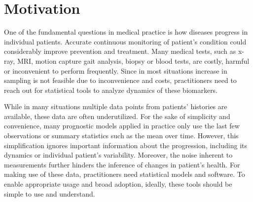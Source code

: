 \documentclass[preprint]{imsart}
\numberwithin{equation}{section}
\theoremstyle{plain}
\begin{document}
\begin{frontmatter}
\begin{abstract}
  
\end{abstract}

\begin{keyword}[class=MSC]
\end{keyword}

\begin{keyword}
\end{keyword}

\end{frontmatter}

\maketitle


\section{Motivation}

One of the fundamental questions in medical practice is how diseases progress in individual patients. Accurate continuous monitoring of patient's condition could considerably improve prevention and treatment. Many medical tests, such as x-ray, MRI, motion capture gait analysis, biopsy or blood tests, are costly, harmful or inconvenient to perform frequently. Since in most situations increase in sampling is not feasible due to inconvenience and costs, practitioners need to reach out for statistical tools to analyze dynamics of these biomarkers.

While in many situations multiple data points from patients' histories are available, these data are often underutilized. For the sake of simplicity and convenience, many prognostic models applied in practice only use the last few observations or summary statistics such as the mean over time. However, this simplification ignores important information about the progression, including its dynamics or individual patient's variability. Moreover, the noise inherent to measurements further hinders the inference of changes in patient's health. For making use of these data, practitioners need statistical models and software. To enable appropriate usage and broad adoption, ideally, these tools should be simple to use and understand.
\end{document}

